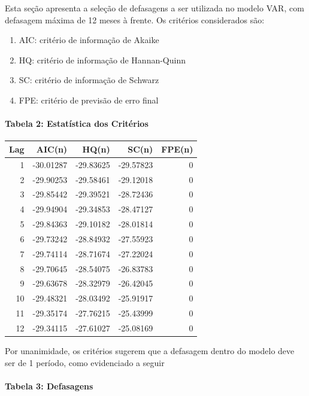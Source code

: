 \documentclass[12pt]{article}
\begin{document}
Esta seção apresenta a seleção de defasagens a ser utilizada no modelo
VAR, com defasagem máxima de 12 meses à frente. Os critérios
considerados são:

\begin{enumerate}
\def\labelenumi{\arabic{enumi}.}
\item
  AIC: critério de informação de Akaike
\item
  HQ: critério de informação de Hannan-Quinn
\item
  SC: critério de informação de Schwarz
\item
  FPE: critério de previsão de erro final
\end{enumerate}

\hypertarget{tabela-2-estatuxedstica-dos-crituxe9rios}{%
\paragraph{Tabela 2: Estatística dos
Critérios}\label{tabela-2-estatuxedstica-dos-crituxe9rios}}

\begin{longtable}[]{@{}rrrrr@{}}
\toprule
Lag & AIC(n) & HQ(n) & SC(n) & FPE(n) \\
\midrule
\endhead
1 & -30.01287 & -29.83625 & -29.57823 & 0 \\
2 & -29.90253 & -29.58461 & -29.12018 & 0 \\
3 & -29.85442 & -29.39521 & -28.72436 & 0 \\
4 & -29.94904 & -29.34853 & -28.47127 & 0 \\
5 & -29.84363 & -29.10182 & -28.01814 & 0 \\
6 & -29.73242 & -28.84932 & -27.55923 & 0 \\
7 & -29.74114 & -28.71674 & -27.22024 & 0 \\
8 & -29.70645 & -28.54075 & -26.83783 & 0 \\
9 & -29.63678 & -28.32979 & -26.42045 & 0 \\
10 & -29.48321 & -28.03492 & -25.91917 & 0 \\
11 & -29.35174 & -27.76215 & -25.43999 & 0 \\
12 & -29.34115 & -27.61027 & -25.08169 & 0 \\
\bottomrule
\end{longtable}

Por unanimidade, os critérios sugerem que a defasagem dentro do modelo
deve ser de 1 período, como evidenciado a seguir

\hypertarget{tabela-3-defasagens}{%
\paragraph{Tabela 3: Defasagens}\label{tabela-3-defasagens}}
\end{document}

